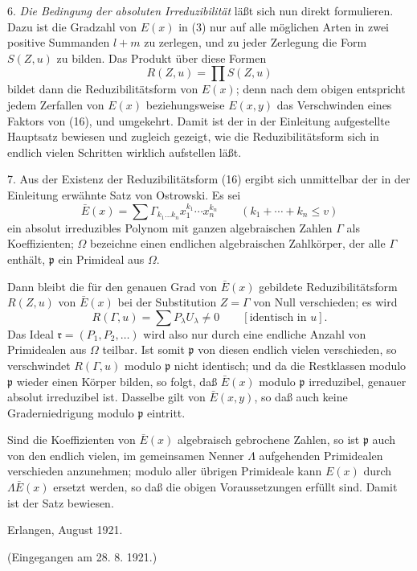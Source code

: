 6. \emph{Die Bedingung der absoluten Irreduzibilität} läßt sich nun direkt formulieren. Dazu ist die Gradzahl von $E(x)$ in (3) nur auf alle möglichen Arten in zwei positive Summanden $l+m$ zu zerlegen, und zu jeder Zerlegung die Form $S(Z,u)$ zu bilden. Das Produkt über diese Formen
\begin{equation}
 R(Z,u)=\prod S(Z,u)
\tag{16}
\end{equation}
bildet dann die Reduzibilitätsform von $E(x)$; denn nach dem obigen entspricht jedem Zerfallen von $E(x)$ beziehungsweise $E(x,y)$ das Verschwinden eines Faktors von (16), und umgekehrt. Damit ist der in der Einleitung aufgestellte Hauptsatz bewiesen und zugleich gezeigt, wie die Reduzibilitätsform sich in endlich vielen Schritten wirklich aufstellen läßt.

7. Aus der Existenz der Reduzibilitätsform (16) ergibt sich unmittelbar der in der Einleitung erwähnte Satz von Ostrowski. Es sei
\[
 \bar E(x)=\sum \Gamma_{k_1\ldots k_n}x_1^{k_1}\cdots x_n^{k_n}
 \qquad(k_1+\cdots+k_n\le v)
\]
ein absolut irreduzibles Polynom mit ganzen algebraischen Zahlen $\Gamma$ als Koeffizienten; $\Omega$ bezeichne einen endlichen algebraischen Zahlkörper, der alle $\Gamma$ enthält, $\mathfrak p$ ein Primideal aus $\Omega$.

Dann bleibt die für den genauen Grad von $\bar E(x)$ gebildete Reduzibilitätsform $R(Z,u)$ von $\bar E(x)$ bei der Substitution $Z=\Gamma$ von Null verschieden; es wird
\[
 R(\Gamma,u)=\sum P_\lambda U_\lambda\ne0\qquad[\text{identisch in }u].
\]
Das Ideal $\mathfrak r=(P_1,P_2,\ldots)$ wird also nur durch eine endliche Anzahl von Primidealen aus $\Omega$ teilbar. Ist somit $\mathfrak p$ von diesen endlich vielen verschieden, so verschwindet $R(\Gamma,u)$ modulo $\mathfrak p$ nicht identisch; und da die Restklassen modulo $\mathfrak p$ wieder einen Körper bilden, so folgt, daß $\bar E(x)$ modulo $\mathfrak p$ irreduzibel, genauer absolut irreduzibel ist. Dasselbe gilt von $\bar E(x,y)$, so daß auch keine Graderniedrigung modulo $\mathfrak p$ eintritt.

Sind die Koeffizienten von $\bar E(x)$ algebraisch gebrochene Zahlen, so ist $\mathfrak p$ auch von den endlich vielen, im gemeinsamen Nenner $\Lambda$ aufgehenden Primidealen verschieden anzunehmen; modulo aller übrigen Primideale kann $E(x)$ durch $\Lambda\bar E(x)$ ersetzt werden, so daß die obigen Voraussetzungen erfüllt sind. Damit ist der Satz bewiesen.

\begin{flushleft}
Erlangen, August 1921.
\end{flushleft}
\begin{center}
(Eingegangen am 28. 8. 1921.)
\end{center}

\clearpage
